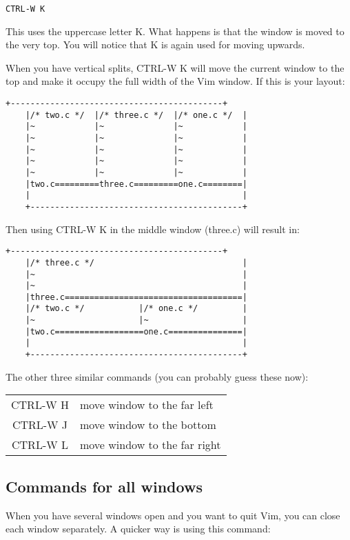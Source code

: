  \begin{Verbatim}[samepage=true]
 CTRL-W K
 \end{Verbatim}

This uses the uppercase letter K.
What happens is that the window is moved to the very top.
You will notice that K is again used for moving upwards.

When you have vertical splits, CTRL-W K will move the current window to the top and make it occupy the full width of the Vim window.
If this is your layout:

		\begin{Verbatim}[samepage=true]
    +-------------------------------------------+
    |/* two.c */  |/* three.c */  |/* one.c */  |
    |~            |~              |~            |
    |~            |~              |~            |
    |~            |~              |~            |
    |~            |~              |~            |
    |~            |~              |~            |
    |two.c=========three.c=========one.c========|
    |                                           |
    +-------------------------------------------+
						\end{Verbatim}

Then using CTRL-W K in the middle window (three.c) will result in:

\begin{Verbatim}[samepage=true]
    +-------------------------------------------+
    |/* three.c */                              |
    |~                                          |
    |~                                          |
    |three.c====================================|
    |/* two.c */           |/* one.c */         |
    |~                     |~                   |
    |two.c==================one.c===============|
    |                                           |
    +-------------------------------------------+
\end{Verbatim}

The other three similar commands (you can probably guess these now):
\begin{center}
				\begin{longtable}{c l}
								CTRL-W H & move window to the far left \\
								CTRL-W J & move window to the bottom \\
								CTRL-W L & move window to the far right \\
				\end{longtable}
\end{center}
\subsection{Commands for all windows}
When you have several windows open and you want to quit Vim, you can close each window separately.
A quicker way is using this command:

